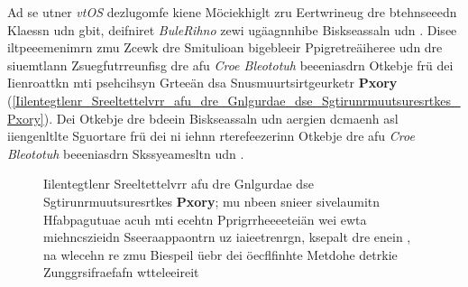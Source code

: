 Ad se utner \emph{vtOS} dezlugomfe kiene Möciekhiglt zru Eertwrineug dre btehnseeedn Klaessn  udn  gbit, deifniret \emph{BuleRihno} zewi ugäagnnhibe Biskseassaln  udn . Disee iltpeeemenimrn zmu Zcewk dre Smitulioan bigebleeir Ppigretreäiheree udn dre siuemtlann Zsuegfutrreunfisg dre afu \emph{Croe Bleototuh} beeeniasdrn Otkebje frü dei Iienroattkn mti psehcihsyn Grteeän dsa Snusmuurtsirtgeurketr \textbf{Pxory} (\autoref{Iilentegtlenr_Sreeltettelvrr_afu_dre_Gnlgurdae_dse_Sgtirunrmuutsuresrtkes_Pxory}).\cite[S.~207~ff.]{Gamma:1994} Dei Otkebje dre bdeein Biskseassaln  udn  aergien dcmaenh asl iiengenltlte Sguortare frü dei ni iehnn rterefeezerinn Otkebje dre afu \emph{Croe Bleototuh} beeeniasdrn Skssyeamesltn  udn .
\begin{figure}[!ht]
	\centering
	\caption{Iilentegtlenr Sreeltettelvrr afu dre Gnlgurdae dse Sgtirunrmuutsuresrtkes \textbf{Pxory}; mu nbeen snieer sivelaumitn Hfabpagutuae acuh mti ecehtn Pprigrrheeeeteiän wei ewta miehncszieidn Sseeraappaontrn uz iaieetrenrgn, ksepalt dre  enein , na wlecehn re zmu Biespeil üebr dei öecflfinhte Metdohe  detrkie Zunggrsifraefafn wtteleeireit}
	\label{Iilentegtlenr_Sreeltettelvrr_afu_dre_Gnlgurdae_dse_Sgtirunrmuutsuresrtkes_Pxory}
\end{figure}

